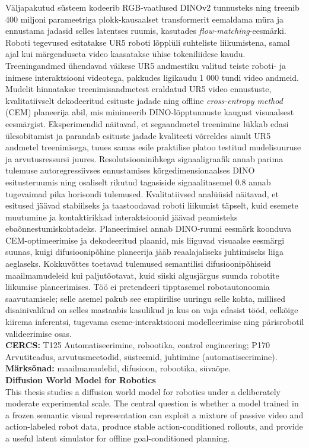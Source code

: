 \documentclass[12pt]{report}
\begin{document}
Väljapakutud süsteem kodeerib RGB-vaatlused DINOv2 tunnusteks ning treenib 400 miljoni parameetriga plokk-kausaalset transformerit eemaldama müra ja ennustama jadasid selles latentses ruumis, kasutades \textit{flow-matching}-eesmärki. Roboti tegevused esitatakse UR5 roboti lõpplüli suhteliste liikumistena, samal ajal kui märgenduseta video kaasatakse ühise tokeniliidese kaudu. Treeningandmed ühendavad väikese UR5 andmestiku valitud teiste roboti- ja inimese interaktsiooni videotega, pakkudes ligikaudu 1 000 tundi video andmeid. Mudelit hinnatakse treenimisandmetest eraldatud UR5 video ennustuste, kvalitatiivselt dekodeeritud esituste jadade ning offline \textit{cross-entropy method} (CEM) planeerija abil, mis minimeerib DINO-lõpptunnuste kaugust visuaalsest eesmärgist.
Eksperimendid näitavad, et segaandmetel treenimine lükkab edasi ülesobitamist ja parandab esituste jadade kvaliteeti võrreldes ainult UR5 andmetel treenimisega, tuues samas esile praktilise platoo testitud mudelisuuruse ja arvutusressursi juures. Resolutsiooninihkega signaaligraafik annab parima tulemuse autoregressiivses ennustamises kõrgedimensionaalses DINO esitusteruumis ning osaliselt rikutud tagasiside signaalitasemel 0.8 annab tugevaimad pika horisondi tulemused. Kvalitatiivsed analüüsid näitavad, et esitused jäävad stabiilseks ja taastoodavad roboti liikumist täpselt, kuid esemete muutumine ja kontaktirikkad interaktsioonid jäävad peamisteks ebaõnnestumiskohtadeks. Planeerimisel annab DINO-ruumi eesmärk koonduva CEM-optimeerimise ja dekodeeritud plaanid, mis liiguvad visuaalse eesmärgi suunas, kuigi difusioonipõhine planeerija jääb reaalajaliseks juhtimiseks liiga aeglaseks.
Kokkuvõttes toetavad tulemused semantilisi difusioonipõhiseid maailmamudeleid kui paljutõotavat, kuid siiski algusjärgus suunda robotite liikumise planeerimises. Töö ei pretendeeri tipptasemel robotautonoomia saavutamisele; selle asemel pakub see empiirilise uuringu selle kohta, millised disainivalikud on selles mastaabis kasulikud ja kus on vaja edasist tööd, eelkõige kiirema inferentsi, tugevama eseme-interaktsiooni modelleerimise ning pärisrobotil valideerimise osas.
\\[5mm]
\textbf{CERCS:} T125 Automatiseerimine, robootika, control engineering; P170 Arvutiteadus, arvutusmeetodid, s\"usteemid, juhtimine (automatiseerimine).
\\[5mm]
\textbf{M\"arks\~onad:} maailmamudelid, difusioon, robootika, s\"uva\~ope.
\\[10mm]
\textbf{Diffusion World Model for Robotics}
\\[5mm]
This thesis studies a diffusion world model for robotics under a deliberately moderate experimental scale. The central question is whether a model trained in a frozen semantic visual representation can exploit a mixture of passive video and action-labeled robot data, produce stable action-conditioned rollouts, and provide a useful latent simulator for offline goal-conditioned planning.
\end{document}

